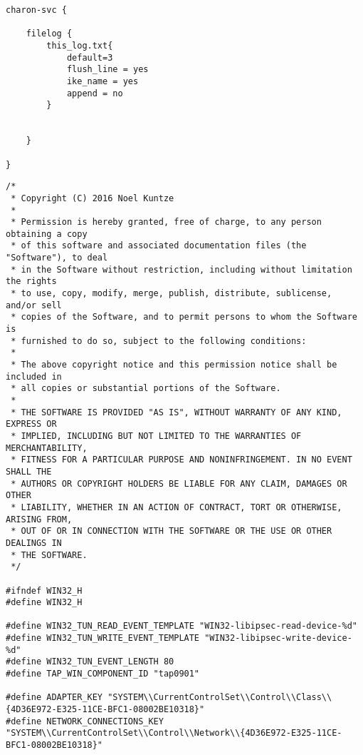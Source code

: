 \begin{center}
\label{lst:strongswan.conf}
\begin{lstlisting}[caption=Testkonfiguration - strongswan.conf,numbers=none]
charon-svc {

	filelog {
		this_log.txt{
			default=3
			flush_line = yes
			ike_name = yes
			append = no
		}
		
	
	}

}
\end{lstlisting}
\end{center}

\begin{center}
\label{lst:libstrongswan-win32.h}
\begin{lstlisting}[caption=Code von win32.h]
/*
 * Copyright (C) 2016 Noel Kuntze
 *
 * Permission is hereby granted, free of charge, to any person obtaining a copy
 * of this software and associated documentation files (the "Software"), to deal
 * in the Software without restriction, including without limitation the rights
 * to use, copy, modify, merge, publish, distribute, sublicense, and/or sell
 * copies of the Software, and to permit persons to whom the Software is
 * furnished to do so, subject to the following conditions:
 *
 * The above copyright notice and this permission notice shall be included in
 * all copies or substantial portions of the Software.
 *
 * THE SOFTWARE IS PROVIDED "AS IS", WITHOUT WARRANTY OF ANY KIND, EXPRESS OR
 * IMPLIED, INCLUDING BUT NOT LIMITED TO THE WARRANTIES OF MERCHANTABILITY,
 * FITNESS FOR A PARTICULAR PURPOSE AND NONINFRINGEMENT. IN NO EVENT SHALL THE
 * AUTHORS OR COPYRIGHT HOLDERS BE LIABLE FOR ANY CLAIM, DAMAGES OR OTHER
 * LIABILITY, WHETHER IN AN ACTION OF CONTRACT, TORT OR OTHERWISE, ARISING FROM,
 * OUT OF OR IN CONNECTION WITH THE SOFTWARE OR THE USE OR OTHER DEALINGS IN
 * THE SOFTWARE.
 */

#ifndef WIN32_H
#define WIN32_H

#define WIN32_TUN_READ_EVENT_TEMPLATE "WIN32-libipsec-read-device-%d"
#define WIN32_TUN_WRITE_EVENT_TEMPLATE "WIN32-libipsec-write-device-%d"
#define WIN32_TUN_EVENT_LENGTH 80
#define TAP_WIN_COMPONENT_ID "tap0901"

#define ADAPTER_KEY "SYSTEM\\CurrentControlSet\\Control\\Class\\{4D36E972-E325-11CE-BFC1-08002BE10318}"
#define NETWORK_CONNECTIONS_KEY "SYSTEM\\CurrentControlSet\\Control\\Network\\{4D36E972-E325-11CE-BFC1-08002BE10318}"


\end{lstlisting}
\end{center}
